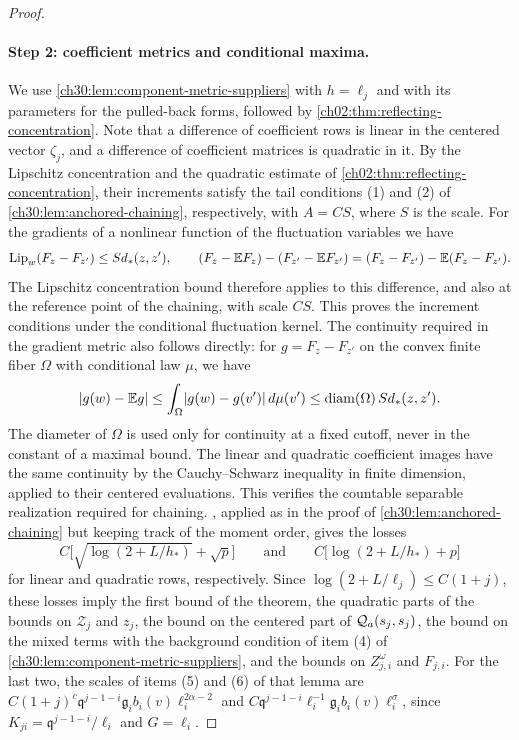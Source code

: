 \begin{proof}
\paragraph{Step 2: coefficient metrics and conditional maxima.} We use \cref{ch30:lem:component-metric-suppliers} with $h=\ell_j$ and with its parameters for the pulled-back forms, followed by \cref{ch02:thm:reflecting-concentration}. Note that a difference of coefficient rows is linear in the centered vector $\zeta_j$, and a difference of coefficient matrices is quadratic in it. By the Lipschitz concentration and the quadratic estimate of \cref{ch02:thm:reflecting-concentration}, their increments satisfy the tail conditions (1) and (2) of \cref{ch30:lem:anchored-chaining}, respectively, with $A=CS$, where $S$ is the scale. For the gradients of a nonlinear function of the fluctuation variables we have
\[
 \operatorname{Lip}_w(F_z-F_{z'})\le Sd_*(z,z'),\qquad
 (F_z-\mathbb E F_z)-(F_{z'}-\mathbb E F_{z'})=(F_z-F_{z'})-\mathbb E(F_z-F_{z'}).
\]
The Lipschitz concentration bound therefore applies to this difference, and also at the reference point of the chaining, with scale $CS$. This proves the increment conditions under the conditional fluctuation kernel. The continuity required in the gradient metric also follows directly: for $g=F_z-F_{z'}$ on the convex finite fiber $\Omega$ with conditional law $\mu$, we have
\[
 \lvert g(w)-\mathbb E g\rvert\le\int_\Omega\lvert g(w)-g(v')\rvert\,d\mu(v')\le\operatorname{diam}(\Omega)\,Sd_*(z,z').
\]
The diameter of $\Omega$ is used only for continuity at a fixed cutoff, never in the constant of a maximal bound. The linear and quadratic coefficient images have the same continuity by the Cauchy--Schwarz inequality in finite dimension, applied to their centered evaluations. This verifies the countable separable realization required for chaining. , applied as in the proof of \cref{ch30:lem:anchored-chaining} but keeping track of the moment order, gives the losses
\[
 C\bigl[\sqrt{\log(2+L/h_*)}+\sqrt p\bigr]\qquad\text{and}\qquad C\bigl[\log(2+L/h_*)+p\bigr]
\]
for linear and quadratic rows, respectively. Since $\log(2+L/\ell_j)\le C(1+j)$, these losses imply the first bound of the theorem, the quadratic parts of the bounds on $\mathcal Z_j$ and $z_j$, the bound on the centered part of $\mathcal Q_{a}(s_j,s_j)$, the bound on the mixed terms with the background condition of item (4) of \cref{ch30:lem:component-metric-suppliers}, and the bounds on $Z^\omega_{j,i}$ and $F_{j,i}$. For the last two, the scales of items (5) and (6) of that lemma are $C(1+j)^c\mathfrak q^{j-1-i}\mathfrak g_ib_i(v)\ell_i^{2\alpha-2}$ and $C\mathfrak q^{j-1-i}\ell_i^{-1}\mathfrak g_ib_i(v)\ell_i^\sigma$, since $K_{ji}=\mathfrak q^{j-1-i}/\ell_i$ and $G=\ell_i$.


\end{proof}
